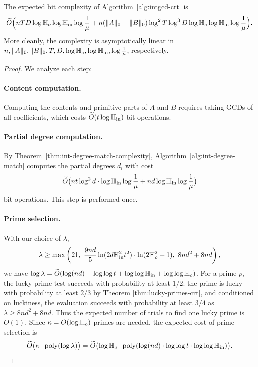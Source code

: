 \documentclass{article}
\numberwithin{equation}{section}
\begin{document}
\begin{theorem}
The expected bit complexity of Algorithm~\ref{alg:intgcd-crt} is
\[
\widetilde{O}\Bigl(
nTD\log\mathbb{H}_{o}\log\mathbb{H}_{\rm in}\log\frac{1}{\mu}
+ n (\|A\|_0+\|B\|_0) \log^2 T \log^3 D \log \mathbb{H}_{o} \log \mathbb{H}_{\rm in}\log\frac{1}{\mu}
\Bigr).
\]
More cleanly, the complexity is asymptotically linear in \(n,\|A\|_0,\|B\|_0, T, D, \log\mathbb{H}_{o}, \log\mathbb{H}_{\rm in}, \log\frac{1}{\mu}\), respectively.
\end{theorem}

\begin{proof}
We analyze each step:

\paragraph{Content computation.}
Computing the contents and primitive parts of \(A\) and \(B\) requires taking GCDs of all coefficients, which costs \(\widetilde{O}(t \log \mathbb{H}_{\rm in})\) bit operations.

\paragraph{Partial degree computation.}
By Theorem~\ref{thm:int-degree-match-complexity}, Algorithm~\ref{alg:int-degree-match} computes the partial degrees \(d_i\) with cost
\[
\widetilde{O}\bigl( n t \log^2 d \cdot \log \mathbb{H}_{\rm in} \log\frac{1}{\mu} + n d \log \mathbb{H}_{\rm in} \log\frac{1}{\mu} \bigr)
\]
bit operations. This step is performed once.

\paragraph{Prime selection.}
With our choice of \(\lambda\),
\[
\lambda \ge \max\left(
    21,\ 
    \frac{9nd}{5} \ln(2d \Hi^2 t^2)\cdot \ln(2\Ho^2+1),\ 
    8nd^2 + 8nd
\right),
\]
we have \(\log \lambda = \widetilde{O}(\log(nd) + \log\log t + \log\log \mathbb{H}_{\rm in} + \log\log \mathbb{H}_{o})\). For a prime \(p\), the lucky prime test succeeds with probability at least \(1/2\): the prime is lucky with probability at least \(2/3\) by Theorem \ref{thm:lucky-primes-crt}, and conditioned on luckiness, the evaluation succeeds with probability at least \(3/4\) as $\lambda\ge 8nd^2 + 8nd$. Thus the expected number of trials to find one lucky prime is \(O(1)\). Since \(\kappa = O(\log \mathbb{H}_{o})\) primes are needed, the expected cost of prime selection is
\[
\widetilde{O}\bigl(\kappa \cdot \operatorname{poly}(\log \lambda)\bigr)
= \widetilde{O}\bigl(\log \mathbb{H}_{o} \cdot \operatorname{poly}(\log(nd) \cdot \log\log t \cdot \log\log \mathbb{H}_{\rm in})\bigr).
\]



\end{proof}
\end{document}
